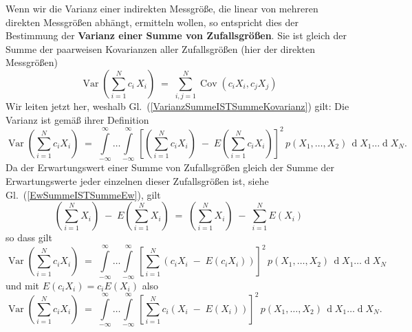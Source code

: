 Wenn wir die Varianz einer indirekten Messgröße, die linear von mehreren direkten Messgrößen
abhängt, ermitteln wollen, so entspricht dies der Bestimmung der
\textbf{Varianz einer Summe von Zufallsgrößen}. Sie ist gleich der Summe der
paarweisen Kovarianzen aller Zufallsgrößen (hier der direkten Messgrößen)
\begin{equation}
\operatorname {Var}\left(\sum _{{i=1}}^{N} c_i \, X_{i}\right) \; = \;
\sum _{{i,j=1}}^{N}\operatorname {Cov}(c_i X_{i},c_j X_{j})
\label{VarianzSummeISTSummeKovarianz}
\end{equation}
Wir leiten jetzt her, weshalb Gl.~(\ref{VarianzSummeISTSummeKovarianz}) gilt:
Die Varianz ist gemäß ihrer Definition
\begin{equation}
\operatorname {Var}\left(\sum _{{i=1}}^{N}c_i X_{i}\right) \; = \;
\int\limits_{-\infty}^{\infty} \dots \int\limits_{-\infty}^{\infty}
\, \left[ \left(\sum_{i=1}^N c_i X_i\right) \; - \; E(\sum_{i=1}^N c_i X_i) \right]^2 \, p(X_1, \dots, X_2)
\, \operatorname{d}X_1 \dots \operatorname{d}X_N .
\end{equation}
Da der Erwartungswert einer Summe von Zufallsgrößen gleich der Summe der 
Erwartungswerte jeder einzelnen dieser Zufallsgrößen ist, siehe Gl.~(\ref{EwSummeISTSummeEw}), gilt
$$
\left(\sum_{i=1}^N X_i \right) \; - \; E(\sum_{i=1}^N X_i) \; = \;
\left(\sum_{i=1}^N X_i \right) \; - \; \sum_{i=1}^N E(X_i) 
$$
so dass gilt
\begin{equation}
\operatorname {Var}\left(\sum _{{i=1}}^{N}c_i X_{i}\right) \; = \;
\int\limits_{-\infty}^{\infty} \dots \int\limits_{-\infty}^{\infty}
\, \left[ \sum_{i=1}^N \left(c_i X_i \; - \; E(c_i X_i)\right) \right]^2 \, p(X_1, \dots, X_2)
\, \operatorname{d}X_1 \dots \operatorname{d}X_N
\end{equation}
und mit $E(c_i X_i) = c_i E(X_i)$ also
\begin{equation}
\operatorname {Var}\left(\sum _{{i=1}}^{N}c_i X_{i}\right) \; = \;
\int\limits_{-\infty}^{\infty} \dots \int\limits_{-\infty}^{\infty}
\, \left[ \sum_{i=1}^N c_i \left( X_i \; - \; E(X_i)\right) \right]^2 \, p(X_1, \dots, X_2)
\, \operatorname{d}X_1 \dots \operatorname{d}X_N .
\end{equation}

